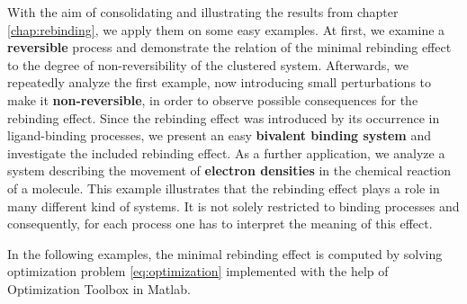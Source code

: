With the aim of consolidating and illustrating the results from chapter \ref{chap:rebinding}, we apply them on some easy examples.
At first, we examine a \textbf{reversible} process and demonstrate the relation of the minimal rebinding effect to the degree of non-reversibility of the clustered system.
Afterwards, we repeatedly analyze the first example, now introducing small perturbations to make it \textbf{non-reversible}, in order to observe possible consequences for the rebinding effect.
Since the rebinding effect was introduced by its occurrence in ligand-binding processes, we present an easy \textbf{bivalent binding system} and investigate the included rebinding effect. %
As a further application, we analyze a system describing the movement of \textbf{electron densities} in the chemical reaction of a molecule. %
This example illustrates that the rebinding effect plays a role in many different kind of systems. It is not solely restricted to binding processes and consequently, for each process one has to interpret the meaning of this effect. %

In the following examples, the minimal rebinding effect is computed by solving optimization problem \eqref{eq:optimization}  implemented with the help of Optimization Toolbox in Matlab.







